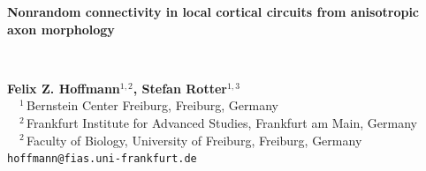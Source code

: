 \documentclass[a0,portrait]{a0poster}
\begin{document}

\vspace{-7cm}

\begin{minipage}[b]{0.9\linewidth}
  \veryHuge \textbf{Nonrandom connectivity in local cortical circuits from anisotropic axon morphology} \color{Black}
\end{minipage}\\
%
\begin{minipage}[b]{0.5\linewidth}
  \huge \textbf{Felix Z. Hoffmann$^{1,2}$, Stefan Rotter$^{1,3}$}\\[0.9cm] %
\large $\quad ^1\,$Bernstein Center Freiburg, Freiburg, Germany\\[0.2cm] %
$\quad ^2\,$Frankfurt Institute for Advanced Studies, Frankfurt am Main, Germany\\[0.2cm]
$\quad ^2\,$Faculty of Biology, University of Freiburg, Freiburg, Germany\\[-0.5cm]

\Large \texttt{hoffmann@fias.uni-frankfurt.de}\\
\end{minipage}
\end{document}
